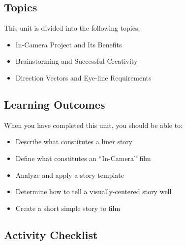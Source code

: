 \documentclass[
]{book}
\providecommand{\tightlist}{%
  \setlength{\itemsep}{0pt}\setlength{\parskip}{0pt}}
\begin{document}
\hypertarget{topics-5}{%
\subsection*{Topics}\label{topics-5}}

This unit is divided into the following topics:

\begin{itemize}
\tightlist
\item
  In-Camera Project and Its Benefits
\item
  Brainstorming and Successful Creativity
\item
  Direction Vectors and Eye-line Requirements
\end{itemize}

\hypertarget{learning-outcomes-5}{%
\subsection*{Learning Outcomes}\label{learning-outcomes-5}}

When you have completed this unit, you should be able to:

\begin{itemize}
\tightlist
\item
  Describe what constitutes a liner story\\
\item
  Define what constitutes an ``In-Camera'' film\\
\item
  Analyze and apply a story template\\
\item
  Determine how to tell a visually-centered story well\\
\item
  Create a short simple story to film
\end{itemize}

\hypertarget{activity-checklist-5}{%
\subsection*{Activity Checklist}\label{activity-checklist-5}}
\end{document}
